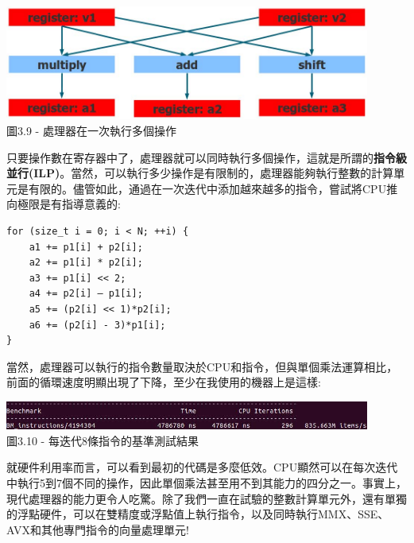\hspace*{\fill} \\ %
\begin{center}
\includegraphics[width=0.9\textwidth]{content/1/chapter3/images/9.jpg}\\
圖3.9 - 處理器在一次執行多個操作
\end{center}

只要操作數在寄存器中了，處理器就可以同時執行多個操作，這就是所謂的\textbf{指令級並行(ILP)}。當然，可以執行多少操作是有限制的，處理器能夠執行整數的計算單元是有限的。儘管如此，通過在一次迭代中添加越來越多的指令，嘗試將CPU推向極限是有指導意義的:

\begin{lstlisting}[style=styleCXX]
for (size_t i = 0; i < N; ++i) {
	a1 += p1[i] + p2[i];
	a2 += p1[i] * p2[i];
	a3 += p1[i] << 2;
	a4 += p2[i] – p1[i];
	a5 += (p2[i] << 1)*p2[i];
	a6 += (p2[i] - 3)*p1[i];
}
\end{lstlisting}

當然，處理器可以執行的指令數量取決於CPU和指令，但與單個乘法運算相比，前面的循環速度明顯出現了下降，至少在我使用的機器上是這樣:

\begin{center}
\includegraphics[width=0.9\textwidth]{content/1/chapter3/images/10.jpg}\\
圖3.10 - 每迭代8條指令的基準測試結果
\end{center}

就硬件利用率而言，可以看到最初的代碼是多麼低效。CPU顯然可以在每次迭代中執行5到7個不同的操作，因此單個乘法甚至用不到其能力的四分之一。事實上，現代處理器的能力更令人吃驚。除了我們一直在試驗的整數計算單元外，還有單獨的浮點硬件，可以在雙精度或浮點值上執行指令，以及同時執行MMX、SSE、AVX和其他專門指令的向量處理單元!


